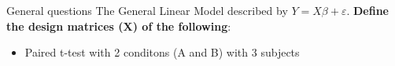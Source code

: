 \documentclass{beamer}
\begin{document}
\begin{frame}{General questions}  
  The General Linear Model described by $Y=X\beta+\varepsilon$. \textbf{Define the design matrices (X) of the following}:

  \begin{itemize}
    \item Paired t-test with 2 conditons (A and B) with 3 subjects
  \end{itemize}

\end{frame}
\end{document}
